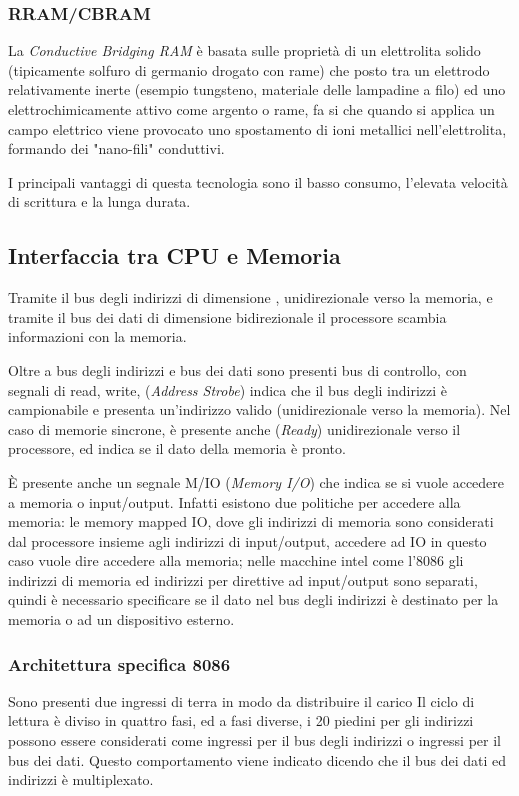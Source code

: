 \documentclass[../template]{subfiles}
\begin{document}
\subsubsection{RRAM/CBRAM}
La \textit{Conductive Bridging RAM} è basata sulle proprietà di un elettrolita solido (tipicamente solfuro di germanio drogato con rame) che posto tra un elettrodo relativamente inerte (esempio tungsteno, materiale delle lampadine a filo) ed uno elettrochimicamente attivo  come argento o rame, fa si che quando si applica un campo elettrico viene provocato uno spostamento di ioni metallici nell'elettrolita, formando dei "nano-fili" conduttivi.

I principali vantaggi di questa tecnologia sono il basso consumo, l'elevata velocità di scrittura e la lunga durata.

\subsection{Interfaccia tra CPU e Memoria}
Tramite il bus degli indirizzi di dimensione , unidirezionale verso la memoria, e tramite il bus dei dati di dimensione  bidirezionale il processore scambia informazioni con la memoria.

Oltre a bus degli indirizzi e bus dei dati sono presenti bus di controllo, con segnali di read, write,  (\textit{Address Strobe}) indica che il bus degli indirizzi è campionabile e presenta un'indirizzo valido (unidirezionale verso la memoria).
Nel caso di memorie sincrone, è presente anche  (\textit{Ready}) unidirezionale verso il processore, ed indica se il dato della memoria è pronto.

È presente anche un segnale M/IO  (\textit{Memory I/O}) che indica se si vuole accedere a memoria o input/output.
Infatti esistono due politiche per accedere alla memoria: le memory mapped IO, dove gli indirizzi di memoria sono considerati dal processore insieme agli indirizzi di input/output, accedere ad IO in questo caso vuole dire accedere alla memoria; nelle macchine intel come l'8086 gli indirizzi di memoria ed indirizzi per direttive ad input/output sono separati, quindi è necessario specificare se il dato nel bus degli indirizzi è destinato per la memoria o ad un dispositivo esterno.

\subsubsection{Architettura specifica 8086}
Sono presenti due ingressi di terra in modo da distribuire il carico
Il ciclo di lettura è diviso in quattro fasi, ed a fasi diverse, i 20 piedini per gli indirizzi possono essere considerati come ingressi per il bus degli indirizzi o ingressi per il bus dei dati. Questo comportamento viene indicato dicendo che il bus dei dati ed indirizzi è multiplexato.
\end{document}
